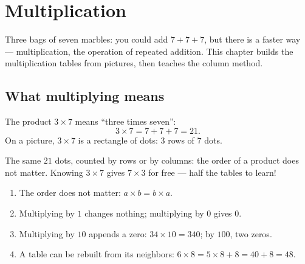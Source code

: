 \chapter{Multiplication}\label{ch:g3:mult}

Three bags of seven marbles: you could add $7 + 7 + 7$, but there is
a faster way --- multiplication, the operation of repeated addition.
This chapter builds the multiplication tables from pictures, then
teaches the column method.

\section{What multiplying means}

\begin{definition}[Multiplication]\label{def:g3:mult:def}
The product $3 \times 7$ means ``three times seven'':
\[
3 \times 7 = 7 + 7 + 7 = 21 .
\]
On a picture, $3 \times 7$ is a rectangle of dots: $3$ rows of $7$
dots.
\end{definition}

\begin{omfigure}

{\small The same $21$ dots, counted by rows or by columns: the order
of a product does not matter. Knowing $3 \times 7$ gives
$7 \times 3$ for free --- half the tables to learn!}
\end{omfigure}

\begin{proposition}\label{prop:g3:mult:rules}
\begin{enumerate}
  \item The order does not matter: $a \times b = b \times a$.
  \item Multiplying by $1$ changes nothing; multiplying by $0$ gives
        $0$.
  \item Multiplying by $10$ appends a zero: $34 \times 10 = 340$;
        by $100$, two zeros.
  \item A table can be rebuilt from its neighbors:
        $6 \times 8 = 5 \times 8 + 8 = 40 + 8 = 48$.
\end{enumerate}
\end{proposition}
\admitted


